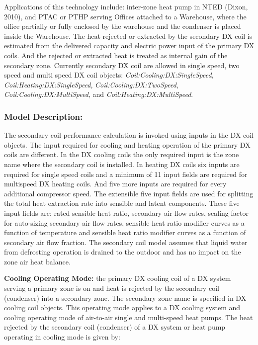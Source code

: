 Applications of this technology include: inter-zone heat pump in NTED (Dixon, 2010), and PTAC or PTHP serving Offices attached to a Warehouse, where the office partially or fully enclosed by the warehouse and the condenser is placed inside the Warehouse. The heat rejected or extracted by the secondary DX coil is estimated from the delivered capacity and electric power input of the primary DX coils. And the rejected or extracted heat is treated as internal gain of the secondary zone. Currently secondary DX coil are allowed in single speed, two speed and multi speed DX coil objects: \emph{Coil:Cooling:DX:SingleSpeed}, \emph{Coil:Heating:DX:SingleSpeed}, \emph{Coil:Cooling:DX:TwoSpeed}, \emph{Coil:Cooling:DX:MultiSpeed}, and \emph{Coil:Heating:DX:MultiSpeed}.

\subsubsection{Model Description:}\label{model-description-12}

The secondary coil performance calculation is invoked using inputs in the DX coil objects. The input required for cooling and heating operation of the primary DX coils are different. In the DX cooling coils the only required input is the zone name where the secondary coil is installed. In heating DX coils six inputs are required for single speed coils and a minimum of 11 input fields are required for multispeed DX heating coils. And five more inputs are required for every additional compressor speed. The extensible five input fields are used for splitting the total heat extraction rate into sensible and latent components. These five input fields are: rated sensible heat ratio, secondary air flow rates, scaling factor for auto-sizing secondary air flow rates, sensible heat ratio modifier curves as a function of temperature and sensible heat ratio modifier curves as a function of secondary air flow fraction. The secondary coil model assumes that liquid water from defrosting operation is drained to the outdoor and has no impact on the zone air heat balance.

\textbf{Cooling Operating Mode:} the primary DX cooling coil of a DX system serving a primary zone is on and heat is rejected by the secondary coil (condenser) into a secondary zone. The secondary zone name is specified in DX cooling coil objects. This operating mode applies to a DX cooling system and cooling operating mode of air-to-air single and multi-speed heat pumps. The heat rejected by the secondary coil (condenser) of a DX system or heat pump operating in cooling mode is given by:

